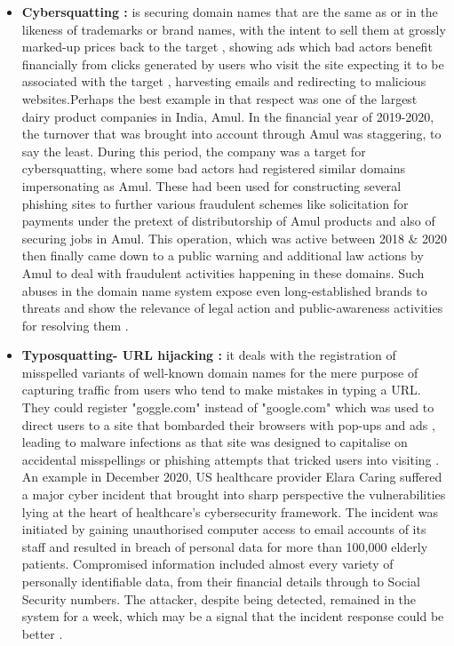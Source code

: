 \begin{itemize}
    \item \textbf{Cybersquatting :} is securing domain names that are the same as or in the likeness of trademarks or brand names, with the intent to sell them at grossly marked-up prices back to the target , showing ads which bad actors benefit financially from clicks generated by users who visit the site expecting it to be associated with the target , harvesting emails and redirecting to malicious websites.Perhaps the best example in that respect was one of the largest dairy product companies in India, Amul. In the financial year of 2019-2020, the turnover that was brought into account through Amul was staggering, to say the least. During this period, the company was a target for cybersquatting, where some bad actors had registered similar domains impersonating as Amul. These had been used for constructing several phishing sites to further various fraudulent schemes like solicitation for payments under the pretext of distributorship of Amul products and also of securing jobs in Amul. This operation, which was active between 2018 \& 2020 then finally came down to a public warning and additional law actions by Amul to deal with fraudulent activities happening in these domains. Such abuses in the domain name system expose even long-established brands to threats and show the relevance of legal action and public-awareness activities for resolving them \cite{MehtaCybersquatting}.
    
    \item \textbf{Typosquatting- URL hijacking :} it deals with the registration of misspelled variants of well-known domain names for the mere purpose of capturing traffic from users who tend to make mistakes in typing a URL. They could register "goggle.com" instead of "google.com" which was used to direct users to a site that bombarded their browsers with pop-ups and ads , leading to malware infections as that site was designed to capitalise on accidental misspellings or phishing  attempts that tricked users into visiting \cite{SplunkTyposquatting}. An example in December 2020, US healthcare provider Elara Caring suffered a major cyber incident that brought into sharp perspective the vulnerabilities lying at the heart of healthcare's cybersecurity framework. The incident was initiated by gaining unauthorised computer access to email accounts of its staff and resulted in breach of personal data for more than 100,000 elderly patients. Compromised information included almost every variety of personally identifiable data, from their financial details through to Social Security numbers. The attacker, despite being detected, remained in the system for a week, which may be a signal that the incident response could be better \cite{PandaSecurityPhishing}.
    

\end{itemize}
